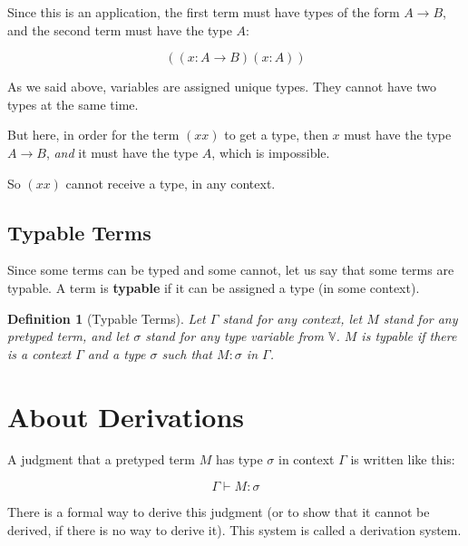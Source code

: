 \documentclass{book}
\numberwithin{equation}{chapter}
\newcommand{\vocab}{\textbf}
\newtheorem{definition}{Definition}
\begin{document}
\noindent
Since this is an application, the first term must have types of the form $A \rightarrow B$, and the second term must have the type $A$:

\begin{equation}
((x : A \rightarrow B) (x : A))
\end{equation}

\noindent
As we said above, variables are assigned unique types. They cannot have two types at the same time. 

But here, in order for the term $(x x)$ to get a type, then $x$ must have the type $A \rightarrow B$, \textit{and} it must have the type $A$, which is impossible.

So $(x x)$ cannot receive a type, in any context.


\section{Typable Terms}

Since some terms can be typed and some cannot, let us say that some terms are typable. A term is \vocab{typable} if it can be assigned a type (in some context).

\begin{definition}[Typable Terms]
Let $\Gamma$ stand for any context, let $M$ stand for any pretyped term, and let $\sigma$ stand for any type variable from $\mathbb{V}$. $M$ is typable if there is a context $\Gamma$ and a type $\sigma$ such that $M : \sigma$ in $\Gamma$.
\end{definition}


\chapter{About Derivations}

A judgment that a pretyped term $M$ has type $\sigma$ in context $\Gamma$ is written like this:

\begin{equation}
\Gamma \vdash M : \sigma
\end{equation}

\noindent
There is a formal way to derive this judgment (or to show that it cannot be derived, if there is no way to derive it). This system is called a derivation system.
\end{document}
